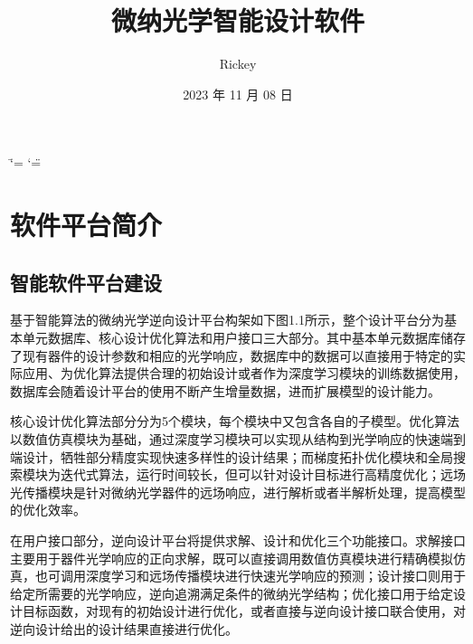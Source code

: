 \documentclass[a4paper,10pt,english]{sphinxmanual}
\title{微纳光学智能设计软件}
\date{2023 年 11 月 08 日}
\author{Rickey}
\begin{document}
\ifdefined\shorthandoff
  \ifnum\catcode`\=\string=\active\shorthandoff{=}\fi
  \ifnum\catcode`\"=\active{}\fi
\fi

\pagestyle{empty}
\sphinxmaketitle
\pagestyle{plain}
\sphinxtableofcontents
\pagestyle{normal}
\label{\detokenize{index::doc}}


\sphinxstepscope


\chapter{软件平台简介}
\label{\detokenize{_u7b80_u4ecb/index:id1}}\label{\detokenize{_u7b80_u4ecb/index::doc}}
\sphinxstepscope


\section{智能软件平台建设}
\label{\detokenize{_u7b80_u4ecb/_u667a_u80fd_u8f6f_u4ef6_u5e73_u53f0_u5efa_u8bbe/index:id1}}\label{\detokenize{_u7b80_u4ecb/_u667a_u80fd_u8f6f_u4ef6_u5e73_u53f0_u5efa_u8bbe/index::doc}}
\sphinxAtStartPar
基于智能算法的微纳光学逆向设计平台构架如下图1.1所示，整个设计平台分为基本单元数据库、核心设计优化算法和用户接口三大部分。其中基本单元数据库储存了现有器件的设计参数和相应的光学响应，数据库中的数据可以直接用于特定的实际应用、为优化算法提供合理的初始设计或者作为深度学习模块的训练数据使用，数据库会随着设计平台的使用不断产生增量数据，进而扩展模型的设计能力。

\sphinxAtStartPar


\sphinxAtStartPar
{}





\sphinxAtStartPar
核心设计优化算法部分分为5个模块，每个模块中又包含各自的子模型。优化算法以数值仿真模块为基础，通过深度学习模块可以实现从结构到光学响应的快速端到端设计，牺牲部分精度实现快速多样性的设计结果；而梯度拓扑优化模块和全局搜索模块为迭代式算法，运行时间较长，但可以针对设计目标进行高精度优化；远场光传播模块是针对微纳光学器件的远场响应，进行解析或者半解析处理，提高模型的优化效率。

\sphinxAtStartPar
在用户接口部分，逆向设计平台将提供求解、设计和优化三个功能接口。求解接口主要用于器件光学响应的正向求解，既可以直接调用数值仿真模块进行精确模拟仿真，也可调用深度学习和远场传播模块进行快速光学响应的预测；设计接口则用于给定所需要的光学响应，逆向追溯满足条件的微纳光学结构；优化接口用于给定设计目标函数，对现有的初始设计进行优化，或者直接与逆向设计接口联合使用，对逆向设计给出的设计结果直接进行优化。
\end{document}
